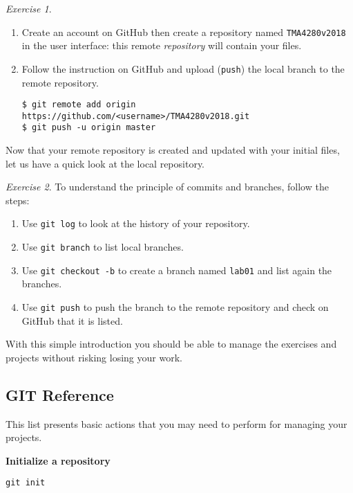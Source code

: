 \documentclass[onecolumn, oneside, a4paper, 11pt]{memoir}
\theoremstyle{remark}
\newtheorem{ex}{Exercise}
\begin{document}
\begin{ex}
\begin{enumerate}
\item Create an account on GitHub then create a repository named \texttt{TMA4280v2018} in the user interface: this remote \textit{repository} will contain your files.

\item Follow the instruction on GitHub and upload (\texttt{push}) the local branch to the remote repository.
\small{
\begin{lstlisting}[style=shell]
$ git remote add origin https://github.com/<username>/TMA4280v2018.git
$ git push -u origin master
\end{lstlisting}
}
\end{enumerate}
\end{ex}

\bigskip
Now that your remote repository is created and updated with your initial files, let us have a quick look at the local repository.

\medskip

\begin{ex}
To understand the principle of commits and branches, follow the steps:
\begin{enumerate}
\item Use \texttt{git log} to look at the history of your repository.
\item Use \texttt{git branch} to list local branches.
\item Use \texttt{git checkout -b} to create a branch named \texttt{lab01} and list again the branches.
\item Use \texttt{git push} to push the branch to the remote repository and check on GitHub that it is listed.
\end{enumerate}
\end{ex}

\bigskip
With this simple introduction you should be able to manage the exercises and projects without risking losing your work.

\newpage
\subsection{GIT Reference}

This list presents basic actions that you may need to perform for managing your projects.

\textbf{Initialize a repository}

\begin{lstlisting}[style=shell]
git init
\end{lstlisting}
\end{document}
